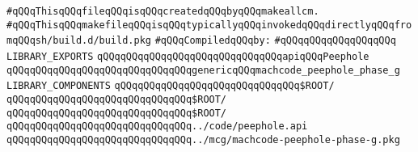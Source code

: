 \label{src/lib/compiler/back/low/lib/peephole.lib}
\verb|#qQQqThisqQQqfileqQQqisqQQqcreatedqQQqbyqQQqmakeallcm.|\newline
\verb|#qQQqThisqQQqmakefileqQQqisqQQqtypicallyqQQqinvokedqQQqdirectlyqQQqfromqQQqsh/build.d/build.pkg|\newline
\newline
\verb|#qQQqCompiledqQQqby:|\newline
\verb|#qQQqqQQqqQQqqQQqqQQq|\newline
\newline
\verb|LIBRARY_EXPORTS|\newline
\newline
\verb|qQQqqQQqqQQqqQQqqQQqqQQqqQQqqQQqapiqQQqPeephole|\newline
\verb|qQQqqQQqqQQqqQQqqQQqqQQqqQQqqQQqgenericqQQqmachcode_peephole_phase_g|\newline
\newline
\newline
\newline
\verb|LIBRARY_COMPONENTS|\newline
\newline
\verb|qQQqqQQqqQQqqQQqqQQqqQQqqQQqqQQq$ROOT/|\newline
\newline
\verb|qQQqqQQqqQQqqQQqqQQqqQQqqQQqqQQq$ROOT/|\newline
\verb|qQQqqQQqqQQqqQQqqQQqqQQqqQQqqQQq$ROOT/|\newline
\newline
\verb|qQQqqQQqqQQqqQQqqQQqqQQqqQQqqQQq../code/peephole.api|\newline
\verb|qQQqqQQqqQQqqQQqqQQqqQQqqQQqqQQq../mcg/machcode-peephole-phase-g.pkg|\newline

